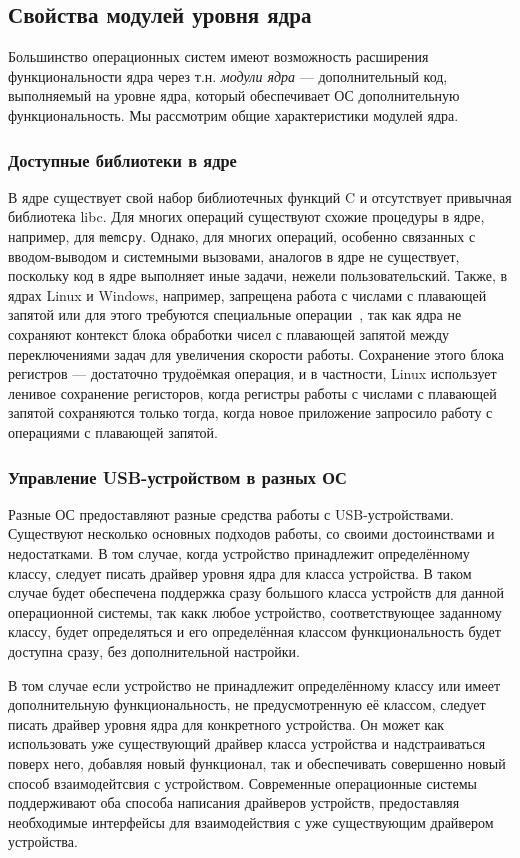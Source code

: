 \documentclass[a4paper,12pt]{report}
\numberwithin{equation}{section}
\begin{document}
\subsection{Свойства модулей уровня ядра}
Большинство операционных систем имеют возможность расширения функциональности
ядра через т.н. \textit{модули ядра} --- дополнительный код, выполняемый на
уровне ядра, который обеспечивает ОС дополнительную функциональность. Мы
рассмотрим общие характеристики модулей ядра.

\subsubsection{Доступные библиотеки в ядре}
В ядре существует свой набор библиотечных функций C и отсутствует привычная
библиотека libc. Для многих операций существуют схожие процедуры в ядре,
например, для \texttt{memcpy}. Однако, для многих операций, особенно связанных с
вводом-выводом и системными вызовами, аналогов в ядре не существует, поскольку
код в ядре выполняет иные задачи, нежели пользовательский. Также, в ядрах Linux
и Windows, например, запрещена работа с числами с плавающей запятой или для
этого требуются специальные операции~\cite{linus:fpu}\cite{msdn:fpu}, так как
ядра не сохраняют контекст блока обработки чисел с плавающей запятой между
переключениями задач для увеличения скорости работы. Сохранение этого блока
регистров --- достаточно трудоёмкая операция, и в частности, Linux использует
ленивое сохранение регисторов, когда регистры работы с числами с плавающей
запятой сохраняются только тогда, когда новое приложение запросило работу с
операциями с плавающей запятой.

\subsubsection{Управление USB-устройством в разных ОС}
Разные ОС предоставляют разные средства работы с USB-устройствами. Существуют
несколько основных подходов работы, со своими достоинствами и недостатками.
В том случае, когда устройство принадлежит определённому классу, следует писать
драйвер уровня ядра для класса устройства. В таком случае будет обеспечена
поддержка сразу большого класса устройств для данной операционной системы, так
какк любое устройство, соответствующее заданному классу, будет определяться и
его определённая классом функциональность будет доступна сразу, без
дополнительной настройки.

В том случае если устройство не принадлежит определённому классу или имеет
дополнительную функциональность, не предусмотренную её классом, следует писать
драйвер уровня ядра для конкретного устройства. Он может как использовать уже
существующий драйвер класса устройства и надстраиваться поверх него, добавляя
новый функционал, так и обеспечивать совершенно новый способ взаимодейтсвия с
устройством. Современные операционные системы поддерживают оба способа написания
драйверов устройств, предоставляя необходимые интерфейсы для взаимодействия с
уже существующим драйвером устройства.
\end{document}
